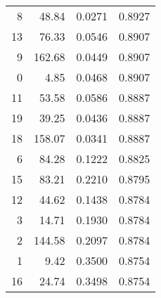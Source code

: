 \documentclass[11pt]{diazessay}
\begin{document}
\begin{table}[h]
\begin{tabular}{@{}rrrr@{}}
		8                                          & 48.84                                     & 0.0271                                        & 0.8927                                        \\
		13                                         & 76.33                                     & 0.0546                                        & 0.8907                                        \\
		9                                          & 162.68                                    & 0.0449                                        & 0.8907                                        \\
		0                                          & 4.85                                      & 0.0468                                        & 0.8907                                        \\
		11                                         & 53.58                                     & 0.0586                                        & 0.8887                                        \\
		19                                         & 39.25                                     & 0.0436                                        & 0.8887                                        \\
		18                                         & 158.07                                    & 0.0341                                        & 0.8887                                        \\
		6                                          & 84.28                                     & 0.1222                                        & 0.8825                                        \\
		15                                         & 83.21                                     & 0.2210                                        & 0.8795                                        \\
		12                                         & 44.62                                     & 0.1438                                        & 0.8784                                        \\
		3                                          & 14.71                                     & 0.1930                                        & 0.8784                                        \\
		2                                          & 144.58                                    & 0.2097                                        & 0.8784                                        \\
		1                                          & 9.42                                      & 0.3500                                        & 0.8754                                        \\
		16                                         & 24.74                                     & 0.3498                                        & 0.8754                                        \\ \bottomrule
	\end{tabular}
\end{table}
\end{document}
